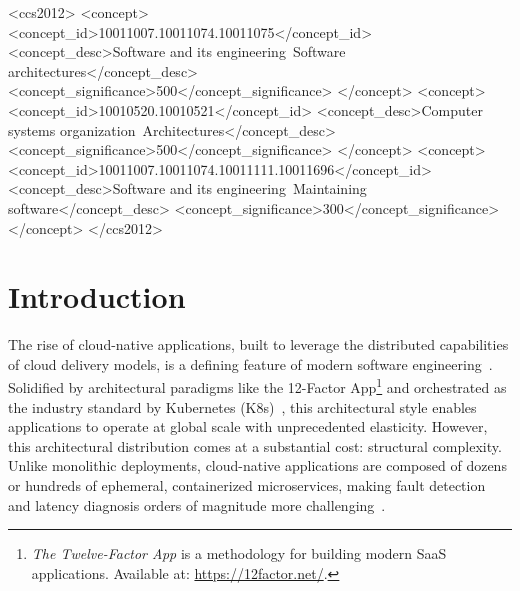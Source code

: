 \documentclass[sigconf, anonymous, balance=false]{acmart}
\begin{document}
\begin{CCSXML}
<ccs2012>
  <concept>
    <concept_id>10011007.10011074.10011075</concept_id>
    <concept_desc>Software and its engineering~Software architectures</concept_desc>
    <concept_significance>500</concept_significance>
  </concept>
  <concept>
    <concept_id>10010520.10010521</concept_id>
    <concept_desc>Computer systems organization~Architectures</concept_desc>
    <concept_significance>500</concept_significance>
  </concept>
  <concept>
    <concept_id>10011007.10011074.10011111.10011696</concept_id>
    <concept_desc>Software and its engineering~Maintaining software</concept_desc>
    <concept_significance>300</concept_significance>
  </concept>
</ccs2012>
\end{CCSXML}



\frenchspacing
\maketitle

\section{Introduction}
\label{sec:introduction}

The rise of cloud-native applications, built to leverage the distributed capabilities of cloud delivery models, is a defining feature of modern software engineering~\cite{vancamp24, oracle_2021}. Solidified by architectural paradigms like the 12-Factor App\footnote{\textit{The Twelve-Factor App} is a methodology for building modern SaaS applications. Available at: \url{https://12factor.net/}.} and orchestrated as the industry standard by Kubernetes (K8s)~\cite{gannon_2017, cncf_survey_2023, vancamp24}, this architectural style enables applications to operate at global scale with unprecedented elasticity. However, this architectural distribution comes at a substantial cost: structural complexity. Unlike monolithic deployments, cloud-native applications are composed of dozens or hundreds of ephemeral, containerized microservices, making fault detection and latency diagnosis orders of magnitude more challenging~\cite{usman_2022}.
\end{document}
